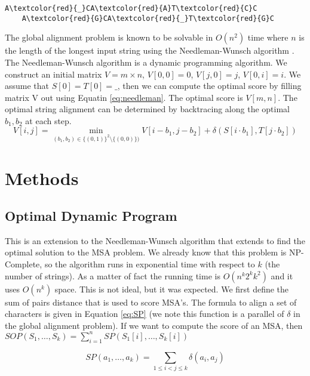 \documentclass[11pt]{article}
\begin{document}
\begin{Verbatim}[commandchars=\\\{\}]
    A\textcolor{red}{_}CA\textcolor{red}{A}T\textcolor{red}{C}C
    A\textcolor{red}{G}CA\textcolor{red}{_}T\textcolor{red}{G}C
\end{Verbatim}

The global alignment problem is known to be solvable in $O(n^2)$ time where $n$ is the length of the longest input string
using the Needleman-Wunsch algorithm \cite{needleman1970general}.
The Needleman-Wunsch algorithm is a dynamic programming algorithm.
We construct an initial matrix $V = m \times n$, $V[0,0] = 0$, $V[j, 0] = j$, $V[0, i] = i$.
We assume that $S[0] = T[0] = \_$, then we can compute the optimal score by filling matrix V out using Equatin \ref{eq:needleman}.
The optimal score is $V[m, n]$. 
The optimal string alignment can be determined by backtracing along the optimal $b_1, b_2$ at each step.
\begin{equation}
    V[i,j] = \min_{(b_1, b_2) \in \{ (0, 1)\}^ 2 \setminus \{ (0,0)\})} 
    V[i-b_1, j-b_2] + \delta(S[i \cdot b_1], T[j \cdot b_2])
    \label{eq:needleman}
\end{equation}

\section{Methods}

\subsection{Optimal Dynamic Program}

This is an extension to the Needleman-Wunsch algorithm that extends to find the optimal solution to the MSA problem.
We already know that this problem is NP-Complete, so the algorithm runs in exponential time with respect to $k$ (the number of strings).
As a matter of fact the running time is $O(n^k 2^k k^2)$ and it uses $O(n^k)$ space.
This is not ideal, but it was expected. 
We first define the sum of pairs distance that is used to score MSA's. 
The formula to align a set of characters is given in Equation \ref{eq:SP}
 (we note this function is a parallel of $\delta$ in the global alignment problem).
If we want to compute the score of an MSA, then $SOP(S_1, \dots, S_k) = \sum_{i = 1} ^n SP(S_1[i], \dots , S_k[i])$

\begin{equation}
    SP(a_1, \dots, a_k) = \sum_{1 \leq i < j \leq k} \delta(a_i, a_j)
    \label{eq:SP}
\end{equation}
\end{document}
